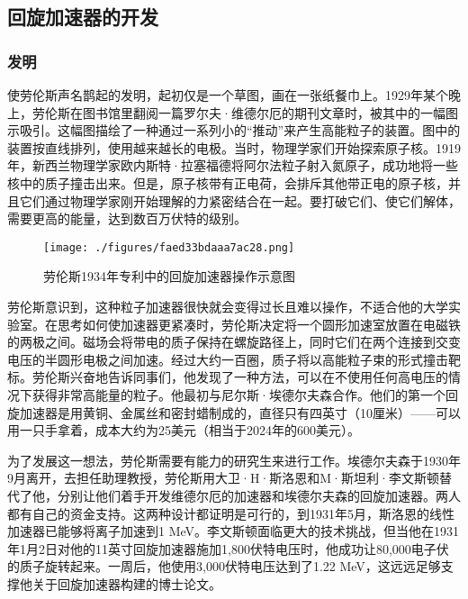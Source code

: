 \subsection{回旋加速器的开发}
\subsubsection{发明}
使劳伦斯声名鹊起的发明，起初仅是一个草图，画在一张纸餐巾上。1929年某个晚上，劳伦斯在图书馆里翻阅一篇罗尔夫·维德尔厄的期刊文章时，被其中的一幅图示吸引。这幅图描绘了一种通过一系列小的“推动”来产生高能粒子的装置。图中的装置按直线排列，使用越来越长的电极。当时，物理学家们开始探索原子核。1919年，新西兰物理学家欧内斯特·拉塞福德将阿尔法粒子射入氮原子，成功地将一些核中的质子撞击出来。但是，原子核带有正电荷，会排斥其他带正电的原子核，并且它们通过物理学家刚开始理解的力紧密结合在一起。要打破它们、使它们解体，需要更高的能量，达到数百万伏特的级别。
\begin{figure}[ht]
\centering
\texttt{[image: ./figures/faed33bdaaa7ac28.png]}
\caption{劳伦斯1934年专利中的回旋加速器操作示意图} \label{fig_ONST_1}
\end{figure}
劳伦斯意识到，这种粒子加速器很快就会变得过长且难以操作，不适合他的大学实验室。在思考如何使加速器更紧凑时，劳伦斯决定将一个圆形加速室放置在电磁铁的两极之间。磁场会将带电的质子保持在螺旋路径上，同时它们在两个连接到交变电压的半圆形电极之间加速。经过大约一百圈，质子将以高能粒子束的形式撞击靶标。劳伦斯兴奋地告诉同事们，他发现了一种方法，可以在不使用任何高电压的情况下获得非常高能量的粒子。他最初与尼尔斯·埃德尔夫森合作。他们的第一个回旋加速器是用黄铜、金属丝和密封蜡制成的，直径只有四英寸（10厘米）——可以用一只手拿着，成本大约为25美元（相当于2024年的600美元）。

为了发展这一想法，劳伦斯需要有能力的研究生来进行工作。埃德尔夫森于1930年9月离开，去担任助理教授，劳伦斯用大卫·H·斯洛恩和M·斯坦利·李文斯顿替代了他，分别让他们着手开发维德尔厄的加速器和埃德尔夫森的回旋加速器。两人都有自己的资金支持。这两种设计都证明是可行的，到1931年5月，斯洛恩的线性加速器已能够将离子加速到1 MeV。李文斯顿面临更大的技术挑战，但当他在1931年1月2日对他的11英寸回旋加速器施加1,800伏特电压时，他成功让80,000电子伏的质子旋转起来。一周后，他使用3,000伏特电压达到了1.22 MeV，这远远足够支撑他关于回旋加速器构建的博士论文。
